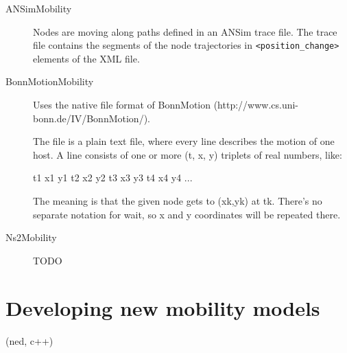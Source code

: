 \begin{description}
\item[ANSimMobility]
Nodes are moving along paths defined in an ANSim trace file.
The trace file contains the segments of the node trajectories
in \verb!<position_change>! elements of the XML file.

\item[BonnMotionMobility] Uses the native file format of BonnMotion
(http://www.cs.uni-bonn.de/IV/BonnMotion/).

The file is a plain text file, where every line describes the motion
of one host. A line consists of one or more (t, x, y) triplets of real
numbers, like:

t1 x1 y1 t2 x2 y2 t3 x3 y3 t4 x4 y4 ...

The meaning is that the given node gets to (xk,yk) at tk. There's no
separate notation for wait, so x and y coordinates will be repeated there.

\item[Ns2Mobility] TODO
\end{description}

\section{Developing new mobility models}
 (ned, c++)




